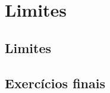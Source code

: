 
\chapter{Limites}\label{cap:limites}

\section{Limites}

\construirExer

\section{Exercícios finais}

\construirExer